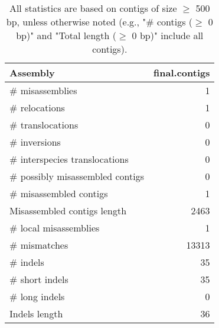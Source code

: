 \documentclass[12pt,a4paper]{article}
\begin{document}
\begin{table}[ht]
\begin{center}
\caption{All statistics are based on contigs of size $\geq$ 500 bp, unless otherwise noted (e.g., "\# contigs ($\geq$ 0 bp)" and "Total length ($\geq$ 0 bp)" include all contigs).}
\begin{tabular}{|l*{1}{|r}|}
\hline
Assembly & final.contigs \\ \hline
\# misassemblies & 1 \\ \hline
\hspace{5mm}\# relocations & 1 \\ \hline
\hspace{5mm}\# translocations & 0 \\ \hline
\hspace{5mm}\# inversions & 0 \\ \hline
\hspace{5mm}\# interspecies translocations & 0 \\ \hline
\# possibly misassembled contigs & 0 \\ \hline
\# misassembled contigs & 1 \\ \hline
Misassembled contigs length & 2463 \\ \hline
\# local misassemblies & 1 \\ \hline
\# mismatches & 13313 \\ \hline
\# indels & 35 \\ \hline
\hspace{5mm}\# short indels & 35 \\ \hline
\hspace{5mm}\# long indels & 0 \\ \hline
Indels length & 36 \\ \hline
\end{tabular}
\end{center}
\end{table}
\end{document}
